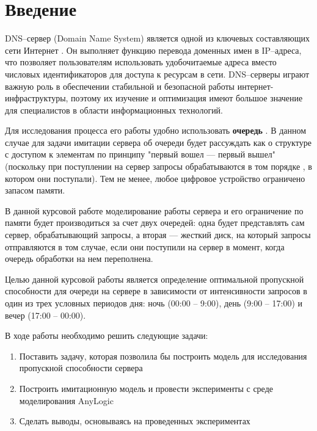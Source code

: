 

\def\oldbibitem{}
\let\oldbibitem=\bibitem
\def\bibitem{\stepcounter{citenum}\oldbibitem}




\tableofcontents
\newpage
\section{Введение}
DNS--сервер (Domain Name System) является одной из ключевых составляющих сети Интернет \cite{dns}. Он выполняет функцию перевода доменных имен в IP--адреса,
что позволяет пользователям использовать удобочитаемые адреса вместо числовых идентификаторов для доступа к ресурсам в сети. DNS--серверы играют
важную роль в обеспечении стабильной и безопасной работы интернет-инфраструктуры, поэтому их изучение и оптимизация имеют большое значение для
специалистов в области информационных технологий.

Для исследования процесса его работы удобно использовать \textbf{очередь} \cite{server}. В данном случае для задачи имитации сервера об очереди будет рассуждать как
о структуре с доступом к элементам по принципу "первый вошел --- первый вышел" \cite{fifo} (поскольку при поступлении на сервер запросы обрабатываются в том порядке
, в котором они поступали). Тем не менее, любое цифровое устройство ограничено запасом памяти.

В данной курсовой работе моделирование работы сервера и его ограничение по памяти будет производиться за счет двух очередей: одна будет
представлять сам сервер, обрабатывающий запросы, а вторая --- жесткий диск, на который запросы отправляются в том случае, если они поступили на сервер в момент,
когда очередь обработки на нем переполнена.

Целью данной курсовой работы является определение оптимальной пропускной способности для очереди на сервере в зависимости от интенсивности запросов в
один из трех условных периодов дня: ночь (00:00 -- 9:00), день (9:00 -- 17:00) и вечер (17:00 -- 00:00).

В ходе работы необходимо решить следующие задачи:
\begin{enumerate}
    \item Поставить задачу, которая позволила бы построить модель для исследования пропускной способности сервера
    \item Построить имитационную модель и провести эксперименты с среде моделирования AnyLogic
    \item Сделать выводы, основываясь на проведенных экспериментах
\end{enumerate}

